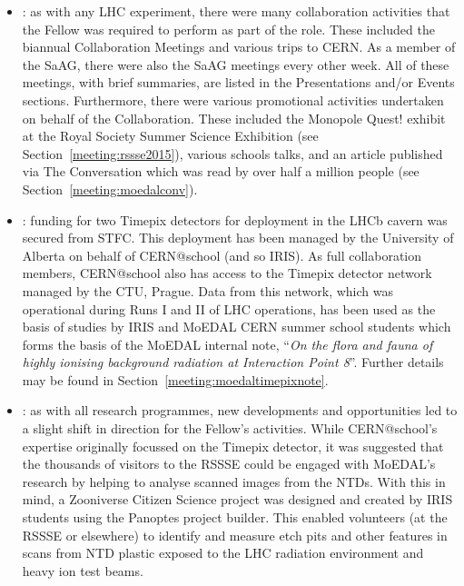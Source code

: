\begin{itemize}
\item {}:
as with any \acs{LHC} experiment, there were many collaboration activities
that the Fellow was required to perform as part of the role.
These included the biannual Collaboration Meetings
and various trips to \acs{CERN}.
As a member of the \ac{SaAG},
there were also the \ac{SaAG} meetings every other week.
All of these meetings, with brief summaries,
are listed in the Presentations and/or Events sections.
Furthermore, there were various promotional activities
undertaken on behalf of the Collaboration. These included the
Monopole Quest! exhibit at the Royal Society Summer Science Exhibition
(see Section~\ref{meeting:rssse2015}),
various schools talks,
and an article published via The Conversation which was read by
over half a million people (see Section~\ref{meeting:moedalconv}).
%
\item {}:
funding for two Timepix detectors for deployment in the \acs{LHCb}
cavern was secured from \acs{STFC}. This deployment has been managed by
the University of Alberta on behalf of CERN@school (and so \acs{IRIS}).
As full collaboration members, CERN@school also has access to 
the Timepix detector network managed by the \acf{CTU}, Prague.
Data from this network, which was operational during Runs I and II of
\acs{LHC} operations, has been used as the basis of studies by
\acs{IRIS} and \acs{MoEDAL} \acs{CERN} summer school students which
forms the basis of the \acs{MoEDAL} internal note,
``{\em On the flora and fauna of highly ionising background radiation
at Interaction Point 8}''.
Further details may be found in Section~\ref{meeting:moedaltimepixnote}.
%
\item {}:
as with all research programmes, new developments and opportunities
led to a slight shift in direction for the Fellow's activities.
While CERN@school's expertise originally focussed on the Timepix detector,
it was suggested that the thousands of visitors to the \ac{RSSSE} 
could be engaged with \acs{MoEDAL}'s research by helping to analyse
scanned images from the \acp{NTD}.
With this in mind,
a Zooniverse Citizen Science project was designed and created
by \acs{IRIS} students using the
Panoptes project builder. This enabled volunteers (at the \ac{RSSSE}
or elsewhere)
to identify and measure etch pits and other features in scans
from \ac{NTD} plastic exposed to the \acs{LHC} radiation environment
and heavy ion test beams.

\end{itemize}
